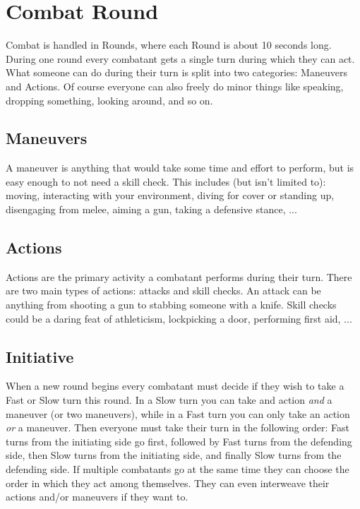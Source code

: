 \section{Combat Round}
Combat is handled in Rounds, where each Round is about 10 seconds long.
During one round every combatant gets a single turn during which they can act.
What someone can do during their turn is split into two categories: Maneuvers and Actions.
Of course everyone can also freely do minor things like speaking, dropping something, looking around, and so on. 

\subsection{Maneuvers}
A maneuver is anything that would take some time and effort to perform, but is easy enough to not need a skill check.
This includes (but isn't limited to): moving, interacting with your environment, 
diving for cover or standing up, disengaging from melee, aiming a gun, taking a defensive stance, ...

\subsection{Actions}
Actions are the primary activity a combatant performs during their turn. 
There are two main types of actions: attacks and skill checks.
An attack can be anything from shooting a gun to stabbing someone with a knife.
Skill checks could be a daring feat of athleticism, lockpicking a door, performing first aid, ... 

\subsection{Initiative}
When a new round begins every combatant must decide if they wish to take a Fast or Slow turn this round.
In a Slow turn you can take and action \textit{and} a maneuver (or two maneuvers), 
while in a Fast turn you can only take an action \textit{or} a maneuver.  
Then everyone must take their turn in the following order:
Fast turns from the initiating side go first, followed by Fast turns from the defending side,
then Slow turns from the initiating side, and finally Slow turns from the defending side.
If multiple combatants go at the same time they can choose the order in which they act among themselves. 
They can even interweave their actions and/or maneuvers if they want to.

